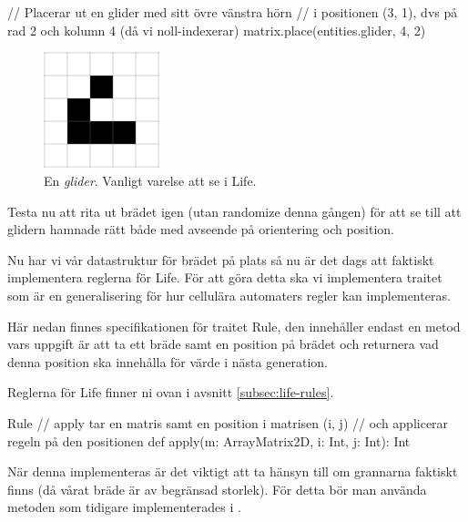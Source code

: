 \begin{Code}
// Placerar ut en glider med sitt övre vänstra hörn
// i positionen (3, 1), dvs på rad 2 och kolumn 4 (då vi noll-indexerar)
matrix.place(entities.glider, 4, 2)
\end{Code}

\begin{figure}[h]
  \begin{center}
    \includegraphics[width=0.3\textwidth]{../img/w12-lab/glider.png}
  \end{center}
  \caption{En \textit{glider}. Vanligt varelse att se i Life.}
\end{figure}

        Testa nu att rita ut brädet igen (utan randomize denna gången) för att se till att glidern hamnade rätt både med avseende på orientering och position.


    Nu har vi vår datastruktur för brädet på plats så nu är det dags att faktiskt implementera reglerna för Life. För att göra detta ska vi implementera traitet  som är en generalisering för hur cellulära automaters regler kan implementeras.

        Här nedan finnes specifikationen för traitet Rule, den innehåller endast en metod  vars uppgift är att ta ett bräde samt en position på brädet och returnera vad denna position ska innehålla för värde i nästa generation.
        
        Reglerna för Life finner ni ovan i avsnitt \ref{subsec:life-rules}.

\begin{ScalaSpec}{Rule}
// apply tar en matris samt en position i matrisen (i, j)
// och applicerar regeln på den positionen
def apply(m: ArrayMatrix2D, i: Int, j: Int): Int
\end{ScalaSpec}

        När denna implementeras är det viktigt att ta hänsyn till om grannarna faktiskt finns (då vårat bräde är av begränsad storlek).
        För detta bör man använda  metoden som tidigare implementerades i .

